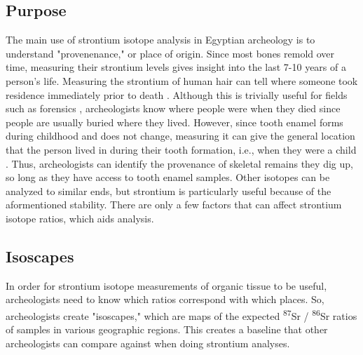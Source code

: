 \documentclass[a4paper, 12pt]{article}
\begin{document}

\subsection{Purpose}
The main use of strontium isotope analysis in Egyptian archeology is to understand
"provenenance," or place of origin. Since most bones remold over time, measuring their
strontium levels gives insight into the last 7-10
years of a person's life. Measuring the strontium of human hair can tell where someone
took residence immediately prior to death \citep{kamenov2014}. Although this is trivially useful for fields such as forensics \citep{kamenov2014},
archeologists know where people were when they died
since people are usually buried where they lived. However, since tooth enamel
forms during childhood and does not change, measuring it can give the general location
that the person lived in during their tooth formation, i.e., when they were a child
\citep*{holt2021,kozieradzkaogunmakin2021,lazzerini2021}. Thus, archeologists can
identify the provenance of skeletal remains they dig up, so long as they have access
to tooth enamel samples. Other isotopes can be analyzed to similar ends, but
strontium is particularly useful because of the aformentioned stability. There are only
a few factors that can affect strontium isotope ratios, which aids analysis.

\subsection{Isoscapes}
In order for strontium isotope measurements of organic tissue to be useful, archeologists need to know
which ratios correspond with which places.
So, archeologists create "isoscapes," which are maps of the expected
\textsuperscript{87}Sr / \textsuperscript{86}Sr ratios
of samples in various geographic regions. This creates a baseline that other archeologists
can compare against when doing strontium analyses.
\end{document}

